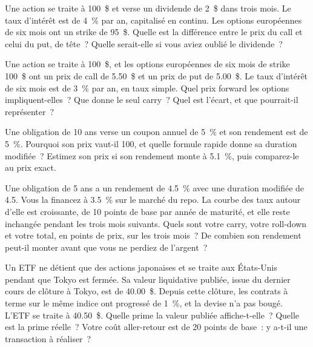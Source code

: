 \begin{question}\label{iq:iv2:options-and-bond-arithmetic-at-speed:14}
Une action se traite à 100~\$ et verse un dividende de 2~\$ dans trois mois. Le taux d'intérêt est de 4~\% par an, capitalisé en continu. Les options européennes de six mois ont un strike de 95~\$. Quelle est la différence entre le prix du call et celui du put, de tête~? Quelle serait-elle si vous aviez oublié le dividende~?
\end{question}

\begin{question}\label{iq:iv2:options-and-bond-arithmetic-at-speed:15}
Une action se traite à 100~\$, et les options européennes de six mois de strike 100~\$ ont un prix de call de 5.50~\$ et un prix de put de 5.00~\$. Le taux d'intérêt de six mois est de 3~\% par an, en taux simple. Quel prix forward les options impliquent-elles~? Que donne le seul carry~? Quel est l'écart, et que pourrait-il représenter~?
\end{question}

\begin{question}\label{iq:iv2:options-and-bond-arithmetic-at-speed:16}
Une obligation de 10 ans verse un coupon annuel de 5~\% et son rendement est de 5~\%. Pourquoi son prix vaut-il 100, et quelle formule rapide donne sa duration modifiée~? Estimez son prix si son rendement monte à 5.1~\%, puis comparez-le au prix exact.
\end{question}

\begin{question}\label{iq:iv2:options-and-bond-arithmetic-at-speed:17}
Une obligation de 5 ans a un rendement de 4.5~\% avec une duration modifiée de 4.5. Vous la financez à 3.5~\% sur le marché du repo. La courbe des taux autour d'elle est croissante, de 10 points de base par année de maturité, et elle reste inchangée pendant les trois mois suivants. Quels sont votre carry, votre roll-down et votre total, en points de prix, sur les trois mois~? De combien son rendement peut-il monter avant que vous ne perdiez de l'argent~?
\end{question}

\begin{question}\label{iq:iv2:options-and-bond-arithmetic-at-speed:18}
Un ETF ne détient que des actions japonaises et se traite aux États-Unis pendant que Tokyo est fermée. Sa valeur liquidative publiée, issue du dernier cours de clôture à Tokyo, est de 40.00~\$. Depuis cette clôture, les contrats à terme sur le même indice ont progressé de 1~\%, et la devise n'a pas bougé. L'ETF se traite à 40.50~\$. Quelle prime la valeur publiée affiche-t-elle~? Quelle est la prime réelle~? Votre coût aller-retour est de 20 points de base~: y a-t-il une transaction à réaliser~?
\end{question}

